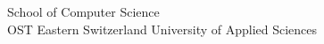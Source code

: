 \begin{titlepage}
\begin{center}
        \vfill


        \vspace{1cm}
        School of Computer Science\\
        OST Eastern Switzerland University of Applied Sciences

    \end{center}

\end{titlepage}
